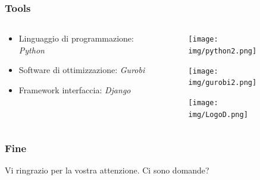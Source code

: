 \documentclass[xcolor={dvipsnames, table}]{beamer}
\begin{document}
\begin{frame}
\frametitle{Tools}
\begin{columns}
\begin{column}{0.70\textwidth}
\begin{itemize}
\item Linguaggio di programmazione: \textit{Python}
\linebreak 
\linebreak
\item Software di ottimizzazione: \textit{Gurobi}
\linebreak 
\linebreak
\item Framework interfaccia: \textit{Django}
\end{itemize}
\end{column}
\begin{column}{0.40\textwidth}
\begin{figure}[h!]
	\begin{center}
  	\texttt{[image: img/python2.png]}
	\end{center}
\end{figure}
\begin{figure}[h!]
	\begin{center}
  	\texttt{[image: img/gurobi2.png]}
	\end{center}
\end{figure}

\begin{figure}[h!]
	\begin{center}
  	\texttt{[image: img/LogoD.png]}
	\end{center}
\end{figure}
\end{column}
\end{columns}
\end{frame}


\begin{frame}
\frametitle{Fine}
Vi ringrazio per la vostra attenzione. Ci sono domande?
\end{frame}

\appendix

\begin{frame}[plain]
\end{frame}
\end{document}
